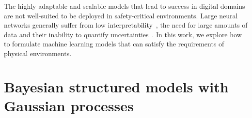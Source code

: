 The highly adaptable and scalable models that lead to success in digital domains are not well-suited to be deployed in safety-critical environments.
Large neural networks generally suffer from low interpretability~\parencite{rudin_stop_2019}, the need for large amounts of data and their inability to quantify uncertainties~\parencite{goodfellow_deep_2016}.
In this work, we explore how to formulate machine learning models that can satisfy the requirements of physical environments.


\section{Bayesian structured models with Gaussian processes}

